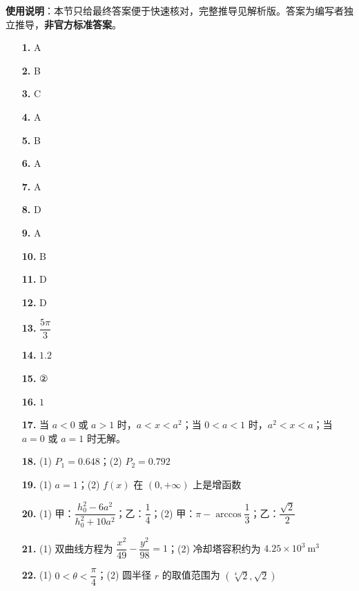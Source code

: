 
\begin{gknotice}
\textbf{使用说明}：本节只给最终答案便于快速核对，完整推导见解析版。答案为编写者独立推导，\textbf{非官方标准答案}。
\end{gknotice}

\begin{itemize}[leftmargin=2.6em]
  \item[\textbf{1.}] A
  \item[\textbf{2.}] B
  \item[\textbf{3.}] C
  \item[\textbf{4.}] A
  \item[\textbf{5.}] B
  \item[\textbf{6.}] A
  \item[\textbf{7.}] A
  \item[\textbf{8.}] D
  \item[\textbf{9.}] A
  \item[\textbf{10.}] B
  \item[\textbf{11.}] D
  \item[\textbf{12.}] D
  \item[\textbf{13.}] $\dfrac{5\pi}{3}$
  \item[\textbf{14.}] $1.2$
  \item[\textbf{15.}] ②
  \item[\textbf{16.}] $1$
  \item[\textbf{17.}] 当 $a<0$ 或 $a>1$ 时，$a<x<a^2$；当 $0<a<1$ 时，$a^2<x<a$；当 $a=0$ 或 $a=1$ 时无解。
  \item[\textbf{18.}] (1) $P_1=0.648$；(2) $P_2=0.792$
  \item[\textbf{19.}] (1) $a=1$；(2) $f(x)$ 在 $(0,+\infty)$ 上是增函数
  \item[\textbf{20.}] (1) 甲：$\dfrac{h_0^2-6a^2}{h_0^2+10a^2}$；乙：$\dfrac14$；(2) 甲：$\pi-\arccos\dfrac13$；乙：$\dfrac{\sqrt2}{2}$
  \item[\textbf{21.}] (1) 双曲线方程为 $\dfrac{x^2}{49}-\dfrac{y^2}{98}=1$；(2) 冷却塔容积约为 $4.25\times10^3\ \mathrm m^3$
  \item[\textbf{22.}] (1) $0<\theta<\dfrac\pi4$；(2) 圆半径 $r$ 的取值范围为 $\left(\sqrt[4]{2},\sqrt2\right)$
\end{itemize}
